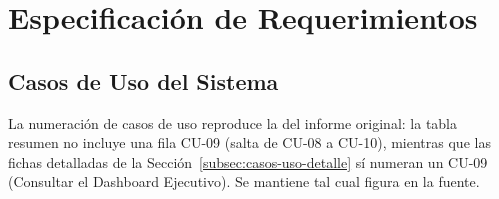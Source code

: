 \section{Especificación de Requerimientos}
\label{sec:requerimientos}

\subsection{Casos de Uso del Sistema}
\label{subsec:casos-uso-tabla}

La numeración de casos de uso reproduce la del informe original: la tabla resumen no
incluye una fila CU-09 (salta de CU-08 a CU-10), mientras que las fichas detalladas de la
Sección~\ref{subsec:casos-uso-detalle} sí numeran un CU-09 (Consultar el Dashboard
Ejecutivo). Se mantiene tal cual figura en la fuente.

